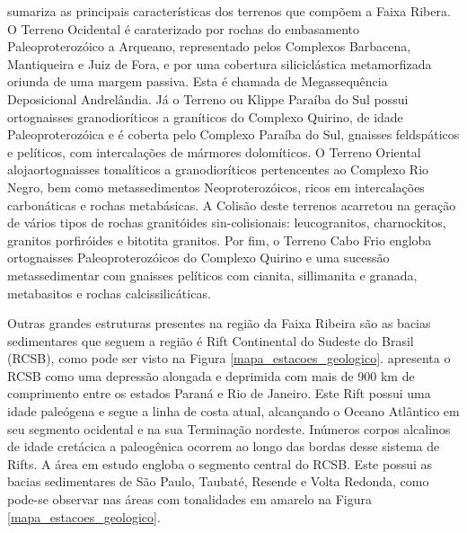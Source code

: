 \cite{trouw_new_2013} sumariza as principais características dos terrenos que compõem a Faixa Ribera. O Terreno Ocidental é caraterizado por rochas do embasamento Paleoproterozóico a Arqueano, representado pelos Complexos Barbacena, Mantiqueira e Juiz de Fora, e por uma cobertura siliciclástica metamorfizada oriunda de uma margem passiva. Esta é chamada de Megassequência Deposicional Andrelândia. Já o Terreno ou Klippe Paraíba do Sul possui ortognaisses granodioríticos a graníticos do Complexo Quirino, de idade Paleoproterozóica e é coberta pelo Complexo Paraíba do Sul, gnaisses feldspáticos e pelíticos, com intercalações de mármores dolomíticos. O Terreno Oriental alojaortognaisses tonalíticos a granodioríticos pertencentes ao Complexo Rio Negro, bem como metassedimentos Neoproterozóicos, ricos em intercalações carbonáticas e rochas metabásicas. A Colisão deste terrenos acarretou na geração de vários tipos de rochas granitóides sin-colisionais: leucogranitos, charnockitos, granitos porfiróides e bitotita granitos. Por fim, o Terreno Cabo Frio engloba ortognaisses Paleoproterozóicos do Complexo Quirino e uma sucessão metassedimentar com gnaisses pelíticos com cianita, sillimanita e granada, metabasitos e rochas calcissilicáticas. 

Outras grandes estruturas presentes na região da Faixa Ribeira são as bacias sedimentares que seguem a região é Rift Continental do Sudeste do Brasil (RCSB), como pode ser visto na Figura \ref{mapa_estacoes_geologico}. \cite{Riccomini_1989} apresenta o RCSB como uma depressão alongada e deprimida com mais de 900 km de comprimento entre os estados Paraná e Rio de Janeiro. Este Rift possui uma idade paleógena e segue a linha de costa atual, alcançando o Oceano Atlântico em seu segmento ocidental e na sua Terminação nordeste. Inúmeros corpos alcalinos de idade cretácica a paleogênica ocorrem ao longo das bordas desse sistema de Rifts. A área em estudo engloba o segmento central do RCSB. Este possui as bacias sedimentares de São Paulo, Taubaté, Resende e Volta Redonda, como pode-se observar nas áreas com tonalidades em amarelo na Figura \ref{mapa_estacoes_geologico}. 

